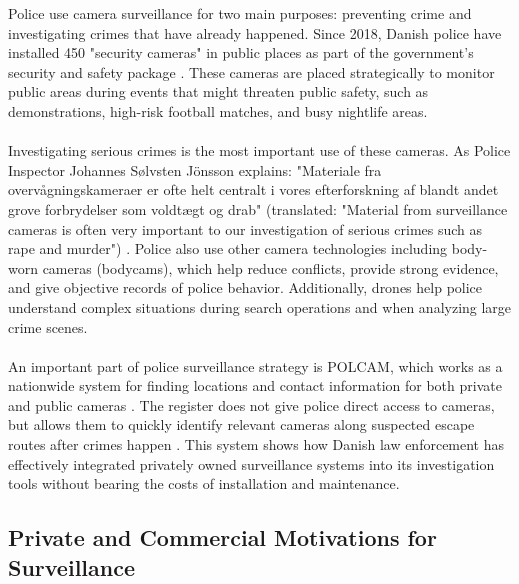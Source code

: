 Police use camera surveillance for two main purposes: preventing crime and investigating crimes that have already happened. Since 2018, Danish police have installed 450 "security cameras" in public places as part of the government's security and safety package \cite{overvagningsekspert2025,videnskab2024}. These cameras are placed strategically to monitor public areas during events that might threaten public safety, such as demonstrations, high-risk football matches, and busy nightlife areas.
\\\\
Investigating serious crimes is the most important use of these cameras. As Police Inspector Johannes Sølvsten Jönsson explains: "Materiale fra overvågningskameraer er ofte helt centralt i vores efterforskning af blandt andet grove forbrydelser som voldtægt og drab" (translated: "Material from surveillance cameras is often very important to our investigation of serious crimes such as rape and murder") \cite{politiet2024opfordrer}. Police also use other camera technologies including body-worn cameras (bodycams), which help reduce conflicts, provide strong evidence, and give objective records of police behavior. Additionally, drones help police understand complex situations during search operations and when analyzing large crime scenes.
\\\\
An important part of police surveillance strategy is \ac{POLCAM}, which works as a nationwide system for finding locations and contact information for both private and public cameras \cite{politiet2024registrer,sikkerhedsbranchen2024,securitas2024guide}. The register does not give police direct access to cameras, but allows them to quickly identify relevant cameras along suspected escape routes after crimes happen \cite{politiet2024opfordrer}. This system shows how Danish law enforcement has effectively integrated privately owned surveillance systems into its investigation tools without bearing the costs of installation and maintenance.

\subsection{Private and Commercial Motivations for Surveillance}


